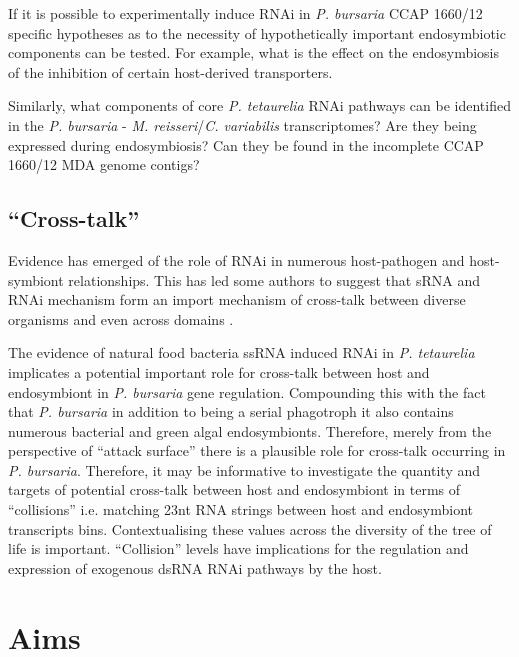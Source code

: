 If it is possible to experimentally induce RNAi in \textit{P. bursaria} CCAP 1660/12
specific hypotheses as to the necessity of hypothetically important
endosymbiotic components can be tested. For example, what is the effect
on the endosymbiosis of the inhibition of certain host-derived transporters.

Similarly, what components of core \textit{P. tetaurelia} RNAi pathways
can be identified 
in the \textit{P. bursaria} - \textit{M. reisseri}/\textit{C. variabilis} transcriptomes?
Are they being expressed during endosymbiosis?  Can they be found in the incomplete
CCAP 1660/12 MDA genome contigs?

\subsection{``Cross-talk''}

Evidence has emerged of the role of RNAi in numerous host-pathogen 
\citep{Nowara2010,LaMonte2012,Weiberg2013,Buck2014}
and host-symbiont \citep{Helber2011,Koch2013} relationships.
This has led some authors to suggest that sRNA and RNAi mechanism form an import
mechanism of cross-talk between diverse organisms and even across
domains \citep{Liang2013,Knip2014,Weiberg2015}.

The evidence of natural food bacteria ssRNA induced RNAi in \textit{P. tetaurelia}
\citep{Carradec2015} implicates a potential important role for cross-talk
between host and endosymbiont in \textit{P. bursaria} gene regulation. Compounding this with the fact
that \textit{P. bursaria} in addition to being a serial phagotroph
it also contains numerous bacterial and green algal endosymbionts.
Therefore, merely from the perspective of ``attack surface'' there is a plausible
role for cross-talk occurring in \textit{P. bursaria}.   Therefore, 
it may be informative to investigate the quantity and targets of
potential cross-talk between host and endosymbiont in terms of 
``collisions''  i.e. matching 23nt RNA strings between host and endosymbiont
transcripts bins.   Contextualising these values 
across the diversity of the tree of life is important.
``Collision'' levels have implications for the regulation and expression of exogenous dsRNA
RNAi pathways by the host. 


\section{Aims}

